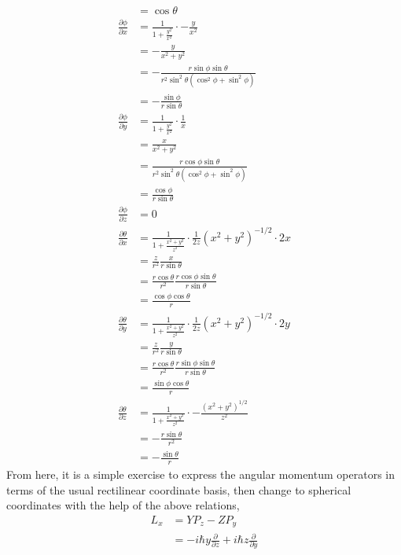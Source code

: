 \documentclass[../principles-of-quantum-mechanics.tex]{subfiles}
\begin{document}
\begin{questions}
\begin{solution}
\begin{align*}
				&= \cos\theta \\
				\frac{\partial \phi}{\partial x} &= \frac{1}{1 + \tfrac{y^2}{x^2}}\cdot{-\frac{y}{x^2}} \\
				&= {-\frac{y}{x^2 + y^2}} \\
				&= -\frac{r\sin\phi\sin\theta}{r^2\sin^2\theta(\cos^2\phi + \sin^2\phi)} \\
				&= {-\frac{\sin\phi}{r\sin\theta}} \\
				\frac{\partial \phi}{\partial y} &= \frac{1}{1 + \tfrac{y^2}{x^2}}\cdot\frac{1}{x} \\
				&= \frac{x}{x^2 + y^2} \\
				&= \frac{r\cos\phi\sin\theta}{r^2\sin^2\theta(\cos^2\phi + \sin^2\phi)} \\
				&= \frac{\cos\phi}{r\sin\theta} \\
				\frac{\partial\phi}{\partial z} &= 0 \\
				\frac{\partial\theta}{\partial x} &= \frac{1}{1 + \tfrac{x^2 + y^2}{z^2}}\cdot\frac{1}{2z}(x^2 + y^2)^{-1/2}\cdot 2x \\
				&= \frac{z}{r^2}\frac{x}{r\sin\theta} \\
				&= \frac{r\cos\theta}{r^2}\frac{r\cos\phi\sin\theta}{r\sin\theta} \\
				&= \frac{\cos\phi\cos\theta}{r} \\
				\frac{\partial \theta}{\partial y} &= \frac{1}{1 + \tfrac{x^2 + y^2}{z^2}}\cdot\frac{1}{2z}(x^2 + y^2)^{-1/2}\cdot 2y \\
				&= \frac{z}{r^2}\frac{y}{r\sin\theta} \\
				&= \frac{r\cos\theta}{r^2}\frac{r\sin\phi\sin\theta}{r\sin\theta} \\
				&= \frac{\sin\phi\cos\theta}{r} \\
				\frac{\partial \theta}{\partial z} &= \frac{1}{1 + \tfrac{x^2 + y^2}{z^2}}\cdot{-\frac{(x^2 + y^2)^{1/2}}{z^2}} \\
				&= {-\frac{r\sin\theta}{r^2}} \\
				&= {-\frac{\sin\theta}{r}}
			\end{align*}
			From here, it is a simple exercise to express the angular momentum operators in terms of the usual rectilinear coordinate basis, then change to spherical coordinates with the help of the above relations,
			\begin{align*}
			L_x &= YP_z - ZP_y \\
			&= -i\hbar y\frac{\partial}{\partial z} + i\hbar z\frac{\partial}{\partial y} \\

\end{align*}
\end{solution}
\end{questions}
\end{document}
